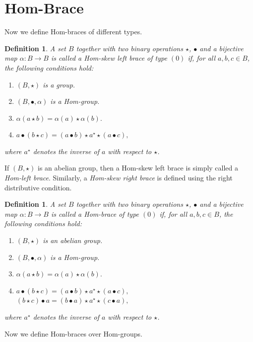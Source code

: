 \documentclass[14pt]{article}
\theoremstyle{Definition}
\newtheorem{Def}[thm]{Definition}
\theoremstyle{remark}
\begin{document}
\section{Hom-Brace}
Now we define Hom-braces of different types.

\begin{Def}
A set $B$ together with two binary operations $\star$, $\bullet$ and a bijective map $\alpha:B\rightarrow B$ is called a \emph{Hom-skew left brace of type $(0)$} if, for all $a,b,c\in B$, the following conditions hold:
\begin{enumerate}
\item[(i)] $(B,\star)$ is a group.
\item[(ii)] $(B,\bullet,\alpha)$ is a Hom-group.
\item[(iii)] $\alpha(a\star b)=\alpha(a)\star \alpha(b).$
\item[(iv)] $a\bullet(b\star c)=(a\bullet b)\star a^{\star}\star(a\bullet c),$
\end{enumerate}
where $a^{\star}$ denotes the inverse of $a$ with respect to $\star$.
\end{Def}

If $(B,\star)$ is an abelian group, then a Hom-skew left brace is simply called a \emph{Hom-left brace}. Similarly, a \emph{Hom-skew right brace} is defined using the right distributive condition.

\begin{Def}\label{def6}
A set $B$ together with two binary operations $\star$, $\bullet$ and a bijective map $\alpha:B\rightarrow B$ is called a \emph{Hom-brace of type $(0)$} if, for all $a,b,c\in B$, the following conditions hold:
\begin{enumerate}
\item[(i)] $(B,\star)$ is an abelian group.
\item[(ii)] $(B,\bullet,\alpha)$ is a Hom-group.
\item[(iii)] $\alpha(a\star b)=\alpha(a)\star \alpha(b).$
\item[(iv)] $a\bullet(b\star c)=(a\bullet b)\star a^{\star}\star(a\bullet c),$ \\
 $(b\star c)\bullet a=(b\bullet a)\star a^{\star}\star(c\bullet a),$
\end{enumerate}
where $a^{\star}$ denotes the inverse of $a$ with respect to $\star$.
\end{Def}

Now we define Hom-braces over Hom-groups.  
\end{document}
